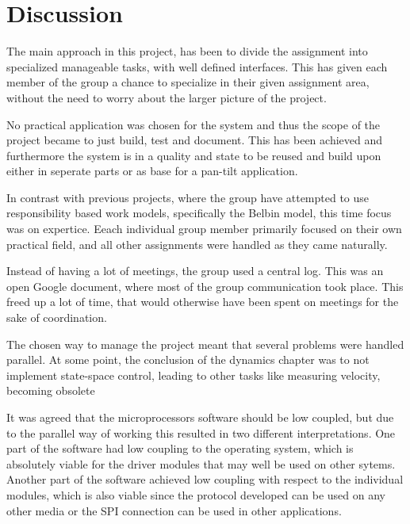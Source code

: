 \chapter{Discussion}\label{chap:discussion}

The main approach in this project, has been to divide the assignment into specialized manageable tasks, with well defined interfaces.  This has given each member of the group a chance to specialize in their given assignment area, without the need to worry about the larger picture of the project.



No practical application was chosen for the system and thus the scope of the project became to just build, test and document. This has been achieved and furthermore the system is in a quality and state to be reused and build upon either in seperate parts or as base for a pan-tilt application.



In contrast with previous projects, where the group have attempted to use responsibility based work models, specifically the Belbin model, this time focus was on expertice. Eeach individual group member primarily focused on their own practical field, and all other assignments were handled as they came naturally. 



Instead of having a lot of meetings, the group used a central log. This was an open Google document, where most of the  group communication took place. This freed up a lot of time, that would otherwise have been spent on meetings for the sake of coordination. 



The chosen way to manage the project meant that several problems were handled parallel. At some point, the conclusion of the dynamics chapter was to not implement state-space control, leading to other tasks like measuring velocity, becoming obsolete



It was agreed that the microprocessors software should be low coupled, but due to the parallel way of working this resulted in two different interpretations. One part of the software had low coupling to the operating system, which is absolutely viable for the driver modules that may well be used on other sytems. Another part of the software achieved low coupling with respect to the individual modules, which is also viable since the protocol developed can be used on any other media or the SPI connection can be used in other applications.



